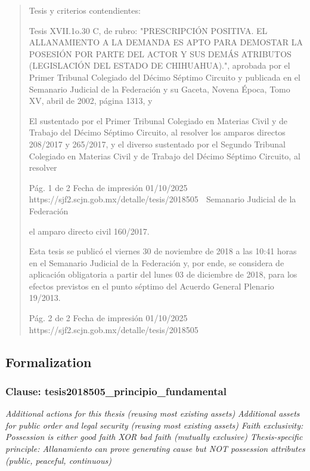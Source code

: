 \documentclass[11pt,a4paper]{article}
\begin{document}
\begin{quote}
Tesis y criterios contendientes:

Tesis XVII.1o.30 C, de rubro: "PRESCRIPCIÓN POSITIVA. EL ALLANAMIENTO A LA DEMANDA
ES APTO PARA DEMOSTAR LA POSESIÓN POR PARTE DEL ACTOR Y SUS DEMÁS
ATRIBUTOS (LEGISLACIÓN DEL ESTADO DE CHIHUAHUA).", aprobada por el Primer Tribunal
Colegiado del Décimo Séptimo Circuito y publicada en el Semanario Judicial de la Federación y su
Gaceta, Novena Época, Tomo XV, abril de 2002, página 1313, y

El sustentado por el Primer Tribunal Colegiado en Materias Civil y de Trabajo del Décimo Séptimo
Circuito, al resolver los amparos directos 208/2017 y 265/2017, y el diverso sustentado por el
Segundo Tribunal Colegiado en Materias Civil y de Trabajo del Décimo Séptimo Circuito, al resolver

                                              Pág. 1 de 2             Fecha de impresión 01/10/2025
  https://sjf2.scjn.gob.mx/detalle/tesis/2018505
                                                   Semanario Judicial de la Federación

el amparo directo civil 160/2017.


Esta tesis se publicó el viernes 30 de noviembre de 2018 a las 10:41 horas en el Semanario
Judicial de la Federación y, por ende, se considera de aplicación obligatoria a partir del lunes 03 de
diciembre de 2018, para los efectos previstos en el punto séptimo del Acuerdo General Plenario
19/2013.




                                              Pág. 2 de 2            Fecha de impresión 01/10/2025
  https://sjf2.scjn.gob.mx/detalle/tesis/2018505

\end{quote}

\subsection{Formalization}

\subsubsection{Clause: tesis2018505\_principio\_fundamental}

\textit{Additional actions for this thesis (reusing most existing assets) Additional assets for public order and legal security (reusing most existing assets) Faith exclusivity: Possession is either good faith XOR bad faith (mutually exclusive) Thesis-specific principle: Allanamiento can prove generating cause but NOT possession attributes (public, peaceful, continuous)}
\end{document}
